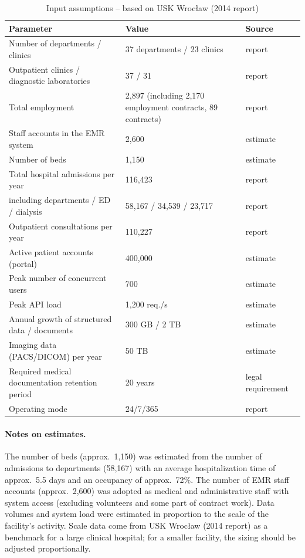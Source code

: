 \begin{table}[h]
\centering
\small
\renewcommand{\arraystretch}{1.15}
\begin{tabular}{|L{5.4cm}|L{6.4cm}|L{2.4cm}|}
\hline
{}\textbf{Parameter} & \textbf{Value} & \textbf{Source} \\
\hline
Number of departments / clinics & 37 departments / 23 clinics & report \\
\hline
Outpatient clinics / diagnostic laboratories & 37 / 31 & report \\
\hline
Total employment & 2,897 (including 2,170 employment contracts, 89 contracts) & report \\
\hline
Staff accounts in the EMR system & 2,600 & estimate \\
\hline
Number of beds & 1,150 & estimate \\
\hline
Total hospital admissions per year & 116,423 & report \\
\hline
\quad including departments / ED / dialysis & 58,167 / 34,539 / 23,717 & report \\
\hline
Outpatient consultations per year & 110,227 & report \\
\hline
Active patient accounts (portal) & 400,000 & estimate \\
\hline
Peak number of concurrent users & 700 & estimate \\
\hline
Peak API load & 1,200 req./s & estimate \\
\hline
Annual growth of structured data / documents & 300 GB / 2 TB & estimate \\
\hline
Imaging data (PACS/DICOM) per year & 50 TB & estimate \\
\hline
Required medical documentation retention period & 20 years & legal requirement \\
\hline
Operating mode & 24/7/365 & report \\
\hline
\end{tabular}
\caption{Input assumptions -- based on USK Wrocław (2014 report)}
\label{tab:zalozenia}
\end{table}

\paragraph{Notes on estimates.} The number of beds (approx.~1,150) was estimated from the number of admissions to departments (58,167) with an average hospitalization time of approx.~5.5 days and an occupancy of approx.~72\%. The number of EMR staff accounts (approx.~2,600) was adopted as medical and administrative staff with system access (excluding volunteers and some part of contract work). Data volumes and system load were estimated in proportion to the scale of the facility's activity. Scale data come from USK Wrocław (2014 report) as a benchmark for a large clinical hospital; for a smaller facility, the sizing should be adjusted proportionally.

